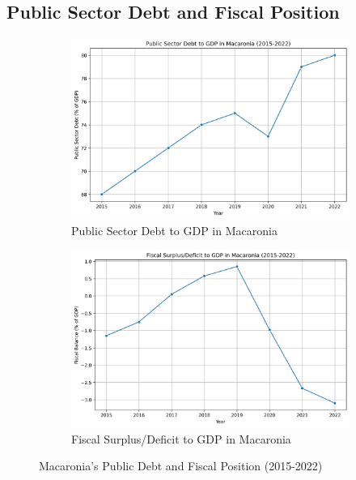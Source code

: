\subsection*{Public Sector Debt and Fiscal Position}

\begin{figure}[h]
    \centering
    \begin{subfigure}{0.48\textwidth}
        \centering
        \includegraphics[width=\textwidth]{debt_to_gdp.png}
        \caption{\small Public Sector Debt to GDP in Macaronia}
        \label{fig:debt_to_gdp}
    \end{subfigure}
    \hfill
    \begin{subfigure}{0.48\textwidth}
        \centering
        \includegraphics[width=\textwidth]{fiscal_to_gdp.png}
        \caption{\small Fiscal Surplus/Deficit to GDP in Macaronia}
        \label{fig:fiscal_to_gdp}
    \end{subfigure}
    \caption{Macaronia’s Public Debt and Fiscal Position (2015-2022)}  %
    \label{fig:public_debt_fiscal}
\end{figure}


